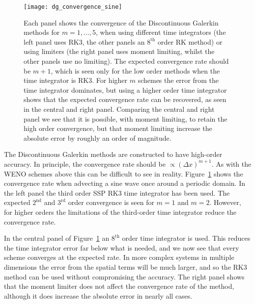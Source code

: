 \begin{figure}[t]
\centering
\texttt{[image: dg\_convergence\_sine]}
\caption[Convergence of Discontinuous Galerkin methods]
{\label{fig:dg_convergence_sine} Each panel shows the convergence of the
Discontinuous Galerkin methods for $m = 1, \dots, 5$, when using different time
integrators (the left panel uses RK3, the other panels an $8^{\text{th}}$ order
RK method) or using limiters (the right panel uses moment limiting, whilst the
other panels use no limiting). The expected convergence rate should be $m+1$,
which is seen only for the low order methods when the time integrator is RK3.
For higher $m$ schemes the error from the time integrator dominates, but using
a higher order time integrator shows that the expected convergence rate can be
recovered, as seen in the central and right panel. Comparing the central and
right panel we see that it is possible, with moment limiting, to retain the high
order convergence, but that moment limiting increase the absolute error by
roughly an order of magnitude. \\
}
\end{figure}
%
The Discontinuous Galerkin methods are constructed to have high-order accuracy.
In principle, the convergence rate should be $\propto (\Delta x)^{m+1}$. As with
the WENO schemes above this can be difficult to see in reality.
Figure~\ref{fig:dg_convergence_sine} shows the convergence rate when advecting
a sine wave once around a periodic domain. In the left panel the third order
SSP RK3 time integrator has been used. The expected $2^{\text{nd}}$ and
$3^{\text{rd}}$ order convergence is seen for $m=1$ and $m=2$. However, for
higher orders the limitations of the third-order time integrator reduce the
convergence rate.

In the central panel of Figure~\ref{fig:dg_convergence_sine} an $8^{\text{th}}$
order time integrator is used. This reduces the time integrator error far below
what is needed, and we now see that every scheme converges at the expected rate.
In more complex systems in multiple dimensions the error from the spatial terms
will be much larger, and so the RK3 method can be used without compromising the
accuracy. The right panel shows that the moment limiter does not affect the
convergence rate of the method, although it does increase the absolute error in
nearly all cases.

